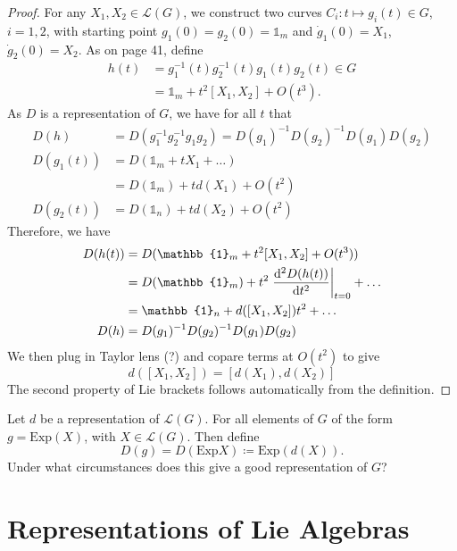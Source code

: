 \begin{proof}
  For any $X_1, X_2 \in \mathscr{L}(G)$, we construct two curves $C_i \colon t \mapsto g_i(t) \in G$, $i = 1, 2$, with starting point $g_1(0) = g_2(0) = \mathbb{1}_m$ and $\dot g_1(0) = X_1$, $\dot g_2(0) = X_2$.
  As on page 41, define
  \begin{align}
    h(t) &= g_1^{-1}(t)g_2^{-1}(t)g_1(t)g_2(t) \in G \\
	 &= \mathbb{1}_m + t^2 [X_1, X_2] + O(t^3).
  \end{align}
  As $D$ is a representation of $G$, we have for all $t$ that
  \begin{align}
    D(h) &= D(g_1^{-1} g_2^{-1} g_1 g_2) = D(g_1)^{-1} D(g_2)^{-1} D(g_1) D(g_2) \\
    D(g_1(t)) &= D(\mathbb{1}_m + t X_1 + \dots) \\
	      &= D(\mathbb{1}_m) + td(X_1) + O(t^2) \\
    D(g_2(t)) &= D(\mathbb{1}_n) + td(X_2) + O(t^2)
  \end{align}
  Therefore, we have
  \begin{align}
    D(h(t)) &= D(\mathbb{1}_m + t^2 [X_1, X_2] + O(t^3)) \\
	    &= D(\mathbb{1}_m) + t^2 \left.\dv[2]{D(h(t))}{t}\right\rvert_{t = 0} + \dots \\
	    &= \mathbb{1}_n + d([X_1, X_2]) t^2 + \dots \\
    D(h) &= D(g_1)^{-1} D(g_2)^{-1} D(g_1) D(g_2)
  \end{align}
  We then plug in Taylor lens (?) and copare terms at $O(t^2)$ to give
  \begin{equation}
    d([X_1, X_2]) = [d(X_1), d(X_2)]
  \end{equation}
  The second property of Lie brackets follows automatically from the definition.
\end{proof}
\begin{exercise}
  Let $d$ be a representation of $\mathscr{L}(G)$. For all elements of $G$ of the form $g = \text{Exp}(X)$, with $X \in \mathscr{L}(G)$. Then define
  \begin{equation}
    D(g) = D(\text{Exp} X) \coloneqq \text{Exp} (d(X)).
  \end{equation}
  Under what circumstances does this give a good representation of $G$?
\end{exercise}

\section{Representations of Lie Algebras}%
\label{sec:representations_of_lie_algebras}

